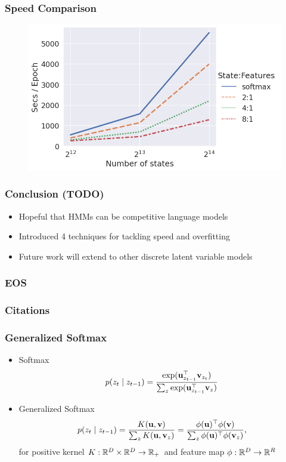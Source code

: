 \documentclass{beamer}
\begin{document}
\begin{frame}
\frametitle{Speed Comparison}
\begin{center}
\begin{figure}
\includegraphics[width=\textwidth]{img/lhmm-states-features-speed.png}
\end{figure}
\end{center}
\end{frame}


\begin{frame}
\frametitle{Conclusion (TODO)}
\begin{itemize}
\item Hopeful that HMMs can be competitive language models
\vspace{2em}
\item Introduced 4 techniques for tackling speed and overfitting
\vspace{2em}
\item Future work will extend to other discrete latent variable models
\end{itemize}
\end{frame}

\begin{frame}
\frametitle{EOS}
\end{frame}


\begin{frame}
\frametitle{Citations}


\end{frame}

\begin{frame}
\frametitle{Generalized Softmax}
\begin{itemize}
\item Softmax
$$p(z_t \mid z_{t-1}) = \frac{\exp(\mathbf{u}_{z_{t-1}}^\top \mathbf{v}_{z_{t}})}
{\sum_z \exp(\mathbf{u}_{z_{t-1}}^\top \mathbf{v}_z)}$$
\vspace{1em}
\item Generalized Softmax
$$p(z_t \mid z_{t-1})
= \frac{K(\mathbf{u}, \mathbf{v})}{\sum_z K(\mathbf{u},\mathbf{v}_z)}
= \frac{\phi(\mathbf{u})^\top\phi(\mathbf{v})}
    {\sum_z \phi(\mathbf{u})^\top\phi(\mathbf{v}_z)},$$
for positive kernel $K:\mathbb{R}^D\times\mathbb{R}^D\to\mathbb{R}_+$
and feature map $\phi:\mathbb{R}^D\to\mathbb{R}^R$
\end{itemize}
\end{frame}
\end{document}
